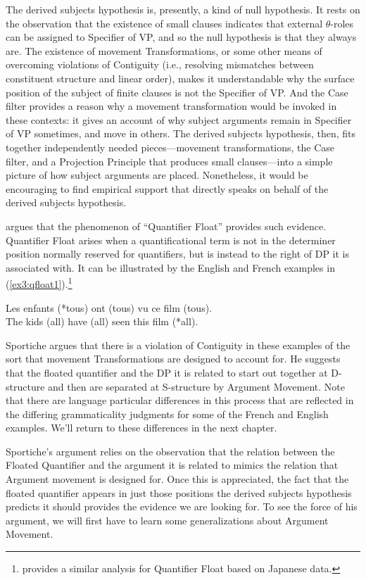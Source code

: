 The derived subjects hypothesis is, presently, a kind of null hypothesis. It rests on the observation that the existence of small clauses indicates that external \mbox{$\theta$-roles} can be assigned to Specifier of VP, and so the null hypothesis is that they always are. The existence of movement Transformations, or some other means of overcoming violations of Contiguity (i.e., resolving mismatches between constituent structure and linear order), makes it understandable why the surface position of the subject of finite clauses is not the Specifier of VP. And the Case filter provides a reason why a movement transformation would be invoked in these contexts: it gives an account of why subject arguments remain in Specifier of VP sometimes, and move in others. The derived subjects hypothesis, then, fits together independently needed pieces---movement transformations, the Case filter, and a Projection Principle that produces small clauses---into a simple picture of how subject arguments are placed. Nonetheless, it would be encouraging to find empirical support that directly speaks on behalf of the derived subjects hypothesis.

\citet{Sportiche:1988} argues that the phenomenon of ``Quantifier Float'' provides such evidence. Quantifier Float arises when a quantificational term is not in the determiner position normally reserved for quantifiers, but is instead to the right of DP it is associated with. It can be illustrated by the English and French examples in (\ref{ex3:qfloat1}).\footnote{\citet{Miyagawa:1989} provides a similar analysis for Quantifier Float based on Japanese data.}
\begin{exe}
	\ex \label{ex3:qfloat1} \gll Les enfants (*tous) ont (tous) vu ce film (tous). \\ The kids (all) have (all) seen this film (*all).\\
\end{exe}
Sportiche argues that there is a violation of Contiguity in these examples of the sort that movement Transformations are designed to account for. He suggests that the floated quantifier and the DP it is related to start out together at D-structure and then are separated at S-structure by Argument Movement. Note  that there are language particular differences in this process that are reflected in the differing grammaticality judgments for some of the French and English examples. We'll return to these differences in the next chapter.

Sportiche's argument relies on the observation that the relation between the Floated Quantifier and the argument it is related to mimics the relation that Argument movement is designed for. Once this is appreciated, the fact that the floated quantifier appears in just those positions the derived subjects hypothesis predicts it should provides the evidence we are looking for. To see the force of his argument, we will first have to learn some generalizations about Argument Movement. 

